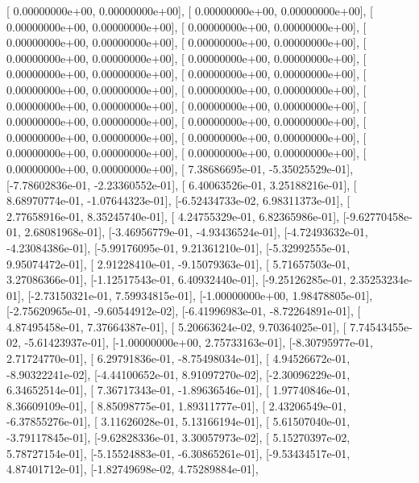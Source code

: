 \documentclass{article}
\begin{document}
       [ 0.00000000e+00,  0.00000000e+00],
       [ 0.00000000e+00,  0.00000000e+00],
       [ 0.00000000e+00,  0.00000000e+00],
       [ 0.00000000e+00,  0.00000000e+00],
       [ 0.00000000e+00,  0.00000000e+00],
       [ 0.00000000e+00,  0.00000000e+00],
       [ 0.00000000e+00,  0.00000000e+00],
       [ 0.00000000e+00,  0.00000000e+00],
       [ 0.00000000e+00,  0.00000000e+00],
       [ 0.00000000e+00,  0.00000000e+00],
       [ 0.00000000e+00,  0.00000000e+00],
       [ 0.00000000e+00,  0.00000000e+00],
       [ 0.00000000e+00,  0.00000000e+00],
       [ 0.00000000e+00,  0.00000000e+00],
       [ 0.00000000e+00,  0.00000000e+00],
       [ 0.00000000e+00,  0.00000000e+00],
       [ 0.00000000e+00,  0.00000000e+00],
       [ 0.00000000e+00,  0.00000000e+00],
       [ 0.00000000e+00,  0.00000000e+00],
       [ 0.00000000e+00,  0.00000000e+00],
       [ 0.00000000e+00,  0.00000000e+00],
       [ 7.38686695e-01, -5.35025529e-01],
       [-7.78602836e-01, -2.23360552e-01],
       [ 6.40063526e-01,  3.25188216e-01],
       [ 8.68970774e-01, -1.07644323e-01],
       [-6.52434733e-02,  6.98311373e-01],
       [ 2.77658916e-01,  8.35245740e-01],
       [ 4.24755329e-01,  6.82365986e-01],
       [-9.62770458e-01,  2.68081968e-01],
       [-3.46956779e-01, -4.93436524e-01],
       [-4.72493632e-01, -4.23084386e-01],
       [-5.99176095e-01,  9.21361210e-01],
       [-5.32992555e-01,  9.95074472e-01],
       [ 2.91228410e-01, -9.15079363e-01],
       [ 5.71657503e-01,  3.27086366e-01],
       [-1.12517543e-01,  6.40932440e-01],
       [-9.25126285e-01,  2.35253234e-01],
       [-2.73150321e-01,  7.59934815e-01],
       [-1.00000000e+00,  1.98478805e-01],
       [-2.75620965e-01, -9.60544912e-02],
       [-6.41996983e-01, -8.72264891e-01],
       [ 4.87495458e-01,  7.37664387e-01],
       [ 5.20663624e-02,  9.70364025e-01],
       [ 7.74543455e-02, -5.61423937e-01],
       [-1.00000000e+00,  2.75733163e-01],
       [-8.30795977e-01,  2.71724770e-01],
       [ 6.29791836e-01, -8.75498034e-01],
       [ 4.94526672e-01, -8.90322241e-02],
       [-4.44100652e-01,  8.91097270e-02],
       [-2.30096229e-01,  6.34652514e-01],
       [ 7.36717343e-01, -1.89636546e-01],
       [ 1.97740846e-01,  8.36609109e-01],
       [ 8.85098775e-01,  1.89311777e-01],
       [ 2.43206549e-01, -6.37855276e-01],
       [ 3.11626028e-01,  5.13166194e-01],
       [ 5.61507040e-01, -3.79117845e-01],
       [-9.62828336e-01,  3.30057973e-02],
       [ 5.15270397e-02,  5.78727154e-01],
       [-5.15524883e-01, -6.30865261e-01],
       [-9.53434517e-01,  4.87401712e-01],
       [-1.82749698e-02,  4.75289884e-01],
\end{document}
